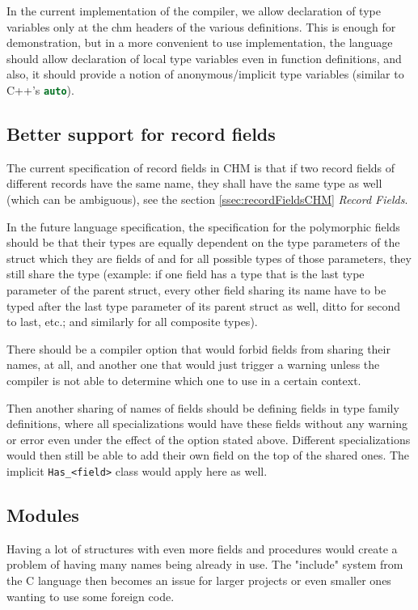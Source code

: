In the current implementation of the compiler, we allow declaration of type variables only at the chm headers of the various definitions. This is enough for demonstration, but in a more convenient to use implementation, the language should allow declaration of local type variables even in function definitions, and also, it should provide a notion of anonymous/implicit type variables (similar to C++'s \lstinline[language=c++]{auto}).

\subsection{Better support for record fields}

The current specification of record fields in CHM is that if two record fields of different records have the same name, they shall have the same type as well (which can be ambiguous), see the section \ref{ssec:recordFieldsCHM} \emph{Record Fields}.

In the future language specification, the specification for the polymorphic fields should be that their types are equally dependent on the type parameters of the struct which they are fields of and for all possible types of those parameters, they still share the type (example: if one field has a type that is the last type parameter of the parent struct, every other field sharing its name have to be typed after the last type parameter of its parent struct as well, ditto for second to last, etc.; and similarly for all composite types).

There should be a compiler option that would forbid fields from sharing their names, at all, and another one that would just trigger a warning unless the compiler is not able to determine which one to use in a certain context.

Then another sharing of names of fields should be defining fields in type family definitions, where all specializations would have these fields without any warning or error even under the effect of the option stated above. Different specializations would then still be able to add their own field on the top of the shared ones. The implicit \lstinline{Has_<field>} class would apply here as well.

\subsection{Modules}

Having a lot of structures with even more fields and procedures would create a problem of having many names being already in use. The "include" system from the C language then becomes an issue for larger projects or even smaller ones wanting to use some foreign code.

